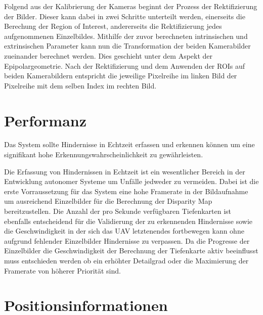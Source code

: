\noindent
Folgend aus der Kalibrierung der Kameras beginnt der Prozess der Rektifizierung der Bilder. Dieser kann dabei in zwei Schritte unterteilt werden, einerseits die Berechung der Region of Interest, andererseits die Rektifizierung jedes aufgenommenen Einzelbildes. Mithilfe der zuvor berechneten intrinsischen und extrinsischen Parameter kann nun die Transformation der beiden Kamerabilder zueinander berechnet werden. Dies geschieht unter dem Aspekt der Epipolargeometrie. Nach der Rektifizierung und dem Anwenden der ROIs auf beiden Kamerabildern entspricht die jeweilige Pixelreihe im linken Bild der Pixelreihe mit dem selben Index im rechten Bild.\\

\section{Performanz}
\label{sec:performanz}

	\begin{anforderung}
	\label{req:performanz}
		Das System sollte Hindernisse in Echtzeit erfassen und erkennen können um eine signifikant hohe Erkennungswahrscheinlichkeit zu gewährleisten.
	\end{anforderung}

\noindent
Die Erfassung von Hindernissen in Echtzeit ist ein wesentlicher Bereich in der Entwicklung autonomer Systeme um Unfälle jedweder zu vermeiden. Dabei ist die erste Vorraussetzung für das System eine hohe Framerate in der Bildaufnahme um ausreichend Einzelbilder für die Berechnung der Disparity Map bereitzustellen. Die Anzahl der pro Sekunde verfügbaren Tiefenkarten ist ebenfalls entscheidend für die Validierung der zu erkennenden Hindernisse sowie die Geschwindigkeit in der sich das UAV letztenendes fortbewegen kann ohne aufgrund fehlender Einzelbilder Hindernisse zu verpassen.
Da die Progresse der Einzelbilder die Geschwindigkeit der Berechnung der Tiefenkarte aktiv beeinflusst muss entschieden werden ob ein erhöhter Detailgrad oder die Maximierung der Framerate von höherer Priorität sind.
	

\section{Positionsinformationen}
\label{sec:positionsinformationen}

